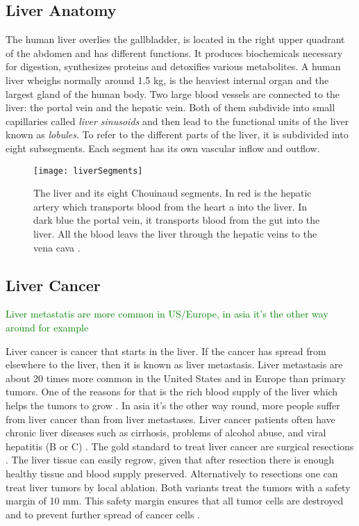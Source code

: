 \subsection{Liver Anatomy}
The human liver overlies the gallbladder, is located in the right upper quadrant of the abdomen and has
different functions. It produces biochemicals necessary for digestion,
synthesizes proteins and detoxifies various metabolites. A human liver wheighs
normally around 1.5 kg, is the heaviest internal organ and the largest gland
of the human body. Two large blood vessels are connected to the liver: the
portal vein and the hepatic vein. Both of them subdivide into small
capillaries called \textit{liver sinusoids} and then lead to the functional
units of the liver known as \textit{lobules}. To refer to the different parts of
the liver, it is subdivided into eight subsegments. Each segment has its own
vascular inflow and outflow.
\begin{figure}[H]
  \centering
 \texttt{[image: liverSegments]}
  \caption{The liver and its eight Chouinaud segments. In red is the hepatic
    artery which transports blood from the heart a into the liver. In dark blue
    the portal vein, it transports blood from the gut into the liver. All the
    blood leavs the liver through the hepatic veins to the vena cava \cite{siriwardena2014management}.}
  \label{fig:liverSegments}
\end{figure}

\subsection{Liver Cancer}
\textcolor{green}{Liver metastatis are more common in US/Europe, in asia it's the other way around for example}

Liver cancer is cancer that starts in the liver. If the cancer has spread from
elsewhere to the liver, then it is known as liver metastasis. Liver metastasis
are about 20 times more common in the United States and in Europe than primary tumors. One of the reasons for that
is the rich blood supply of the liver which helps the tumors to grow
\cite{mcguire2016world}. In asia it's the other way round, more people suffer
from liver cancer than from liver metastases. Liver cancer patients often have chronic liver diseases
such as cirrhosis, problems of alcohol abuse, and viral hepatitis (B or C)
\cite{galun2015hepatocellular}. The gold standard to treat liver cancer are
surgical resections \cite{lencioni2012local}. The liver tissue can easily regrow, given that after resection there is
enough healthy tissue and blood supply preserved. Alternatively to resections
one can treat liver tumors by local ablation. Both variants treat the tumors
with a safety margin of 10 mm. This safety margin ensures that all tumor cells
are destroyed and to prevent further spread of cancer cells \cite{mahnken2009ct}.
